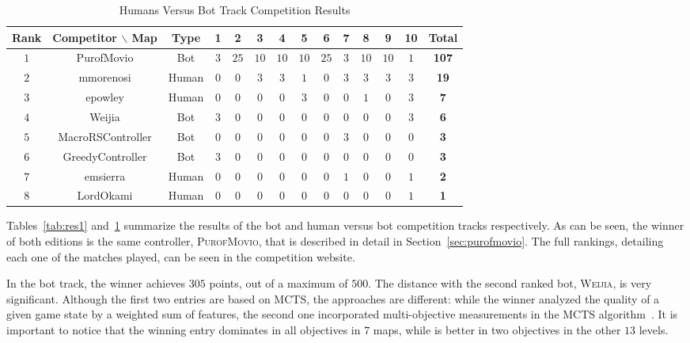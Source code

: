 \documentclass[conference]{IEEEtran}
\begin{document}
\begin{table}[!t]
	\centering
	\begin{tabular}{|c|c|c|c|c|c|c|c|c|c|c|c|c|c|}
		\hline	
\textbf{Rank} & \textbf{Competitor} $\backslash$ \textbf{Map}&\textbf{Type}&\textbf{1}&\textbf{2}&\textbf{3}&\textbf{4}&\textbf{5}&\textbf{6}&\textbf{7}&\textbf{8}&\textbf{9}&\textbf{10}&\textbf{Total}\\
		\hline	
$1$&PurofMovio&Bot&$3$&$25$&$10$&$10$&$10$&$25$&$3$&$10$&$10$&$1$&\textbf{107}\\
		\hline	
$2$&mmorenosi&Human&$0$&$0$&$3$&$3$&$1$&$0$&$3$&$3$&$3$&$3$&\textbf{19}\\
		\hline	
$3$&epowley&Human&$0$&$0$&$0$&$0$&$3$&$0$&$0$&$1$&$0$&$3$&\textbf{7}\\
		\hline	
$4$&Weijia&Bot&$3$&$0$&$0$&$0$&$0$&$0$&$0$&$0$&$0$&$3$&\textbf{6}\\
		\hline	
$5$&MacroRSController&Bot&$0$&$0$&$0$&$0$&$0$&$0$&$3$&$0$&$0$&$0$&\textbf{3}\\
		\hline	
$6$&GreedyController&Bot&$3$&$0$&$0$&$0$&$0$&$0$&$0$&$0$&$0$&$0$&\textbf{3}\\
		\hline	
$7$&emsierra&Human&$0$&$0$&$0$&$0$&$0$&$0$&$1$&$0$&$0$&$1$&\textbf{2}\\
		\hline	
$8$&LordOkami&Human&$0$&$0$&$0$&$0$&$0$&$0$&$0$&$0$&$0$&$1$&\textbf{1}\\
		\hline	
	\end{tabular}
	\caption{Humans Versus Bot Track Competition Results}
	\label{tab:res2}
\end{table}

Tables~\ref{tab:res1} and~\ref{tab:res2} summarize the results of the bot and human versus bot competition tracks respectively. As can be seen, the winner of both editions is the same controller, \textsc{PurofMovio}, that is described in detail in Section~\ref{sec:purofmovio}. The full rankings, detailing each one of the matches played, can be seen in the competition website.

In the bot track, the winner achieves $305$ points, out of a maximum of $500$. The distance with the second ranked bot, \textsc{Weijia}, is very significant. Although the first two entries are based on MCTS, the approaches are different: while the winner analyzed the quality of a given game state by a weighted sum of features, the second one incorporated multi-objective measurements in the MCTS algorithm~\cite{Wang13}. It is important to notice that the winning entry dominates in all objectives in $7$ maps, while is better in two objectives in the other $13$ levels.
\end{document}
